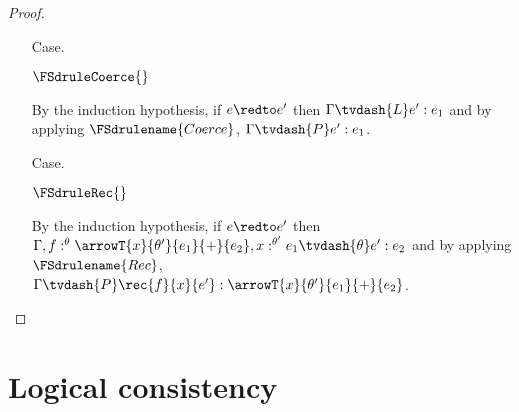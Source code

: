 \begin{proof}
\begin{itemize}
  \item[Case.]\ \\
    \begin{center}
      $\FSdruleCoerce{}$
    \end{center}
    By the induction hypothesis, if $e \redto e'$ then $\Gamma \tvdash{L} e':e_1$ and by applying
    $\FSdrulename{Coerce}$, $\Gamma \tvdash{P} e':e_1$.
    
  \item[Case.]\ \\
    \begin{center}
      $\FSdruleRec{}$
    \end{center}
    By the induction hypothesis, if $e \redto e'$ then 
    $\Gamma, f:^\theta \arrowT{x}{\theta'}{e_1}{+}{e_2},x:^{\theta'} e_1 \tvdash{\theta} e':e_2$ 
    and by applying $\FSdrulename{Rec}$,
    $\Gamma \tvdash{P} \rec{f}{x}{e'}:\arrowT{x}{\theta'}{e_1}{+}{e_2}$.
  \end{itemize}
\end{proof}

\section{Logical consistency}
\label{sec:logical_consistency}

